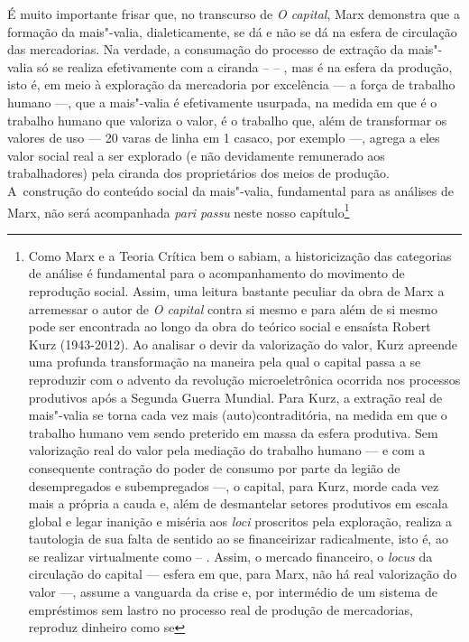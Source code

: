 É muito importante frisar que, no transcurso de \emph{O capital}, Marx
demonstra que a formação da mais"-valia, dialeticamente, se dá e não se
dá na esfera de circulação das mercadorias. Na verdade, a consumação do
processo de extração da mais"-valia só se realiza efetivamente com a
ciranda  --  -- , mas é na esfera da produção, isto é, em meio à
exploração da mercadoria por excelência --- a força de trabalho humano
---, que a mais"-valia é efetivamente usurpada, na medida em que é o
trabalho humano que valoriza o valor, é o trabalho que, além de
transformar os valores de uso --- 20 varas de linha em 1 casaco, por
exemplo ---, agrega a eles valor social real a ser explorado (e não
devidamente remunerado aos trabalhadores) pela ciranda dos proprietários
dos meios de produção. A~construção do conteúdo social da mais"-valia,
fundamental para as análises de Marx, não será acompanhada \emph{pari
passu} neste nosso capítulo\footnote{Como Marx e a Teoria Crítica bem o
  sabiam, a historicização das categorias de análise é fundamental para
  o acompanhamento do movimento de reprodução social. Assim, uma leitura
  bastante peculiar da obra de Marx a arremessar o autor de \emph{O
  capital} contra si mesmo e para além de si mesmo pode ser encontrada
  ao longo da obra do teórico social e ensaísta Robert Kurz (1943-2012).
  Ao analisar o devir da valorização do valor, Kurz apreende uma
  profunda transformação na maneira pela qual o capital passa a se
  reproduzir com o advento da revolução microeletrônica ocorrida nos
  processos produtivos após a Segunda Guerra Mundial. Para Kurz, a
  extração real de mais"-valia se torna cada vez mais
  (auto)contraditória, na medida em que o trabalho humano vem sendo
  preterido em massa da esfera produtiva. Sem valorização real do valor
  pela mediação do trabalho humano --- e com a consequente contração do
  poder de consumo por parte da legião de desempregados e subempregados
  ---, o capital, para Kurz, morde cada vez mais a própria a cauda e,
  além de desmantelar setores produtivos em escala global e legar
  inanição e miséria aos \emph{loci} proscritos pela exploração, realiza
  a tautologia de sua falta de sentido ao se financeirizar radicalmente,
  isto é, ao se realizar virtualmente como  -- . Assim, o mercado
  financeiro, o \emph{locus} da circulação do capital --- esfera em que,
  para Marx, não há real valorização do valor ---, assume a vanguarda da
  crise e, por intermédio de um sistema de empréstimos sem lastro no
  processo real de produção de mercadorias, reproduz dinheiro como se
}
